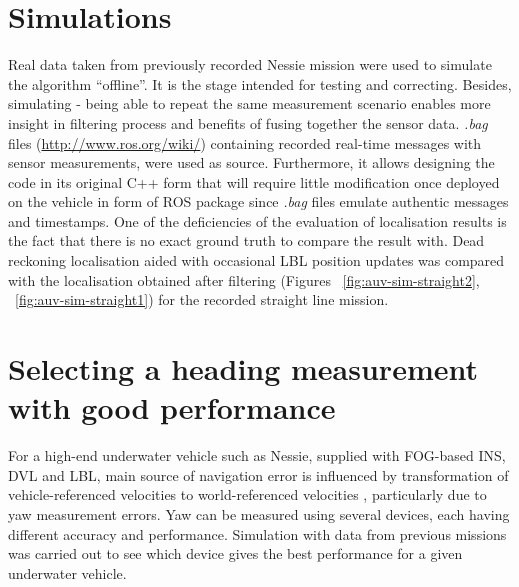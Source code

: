 \section{Simulations} \label{sec:sim}
Real data taken from previously recorded Nessie mission were used to simulate the algorithm ``offline''. It is the stage intended for testing and correcting. Besides, simulating - being able to repeat the same measurement scenario enables more insight in filtering process and benefits of fusing together the sensor data. \textit{.bag} files (\url{http://www.ros.org/wiki/}) containing recorded real-time messages with sensor measurements, were used as source. Furthermore, it allows designing the code in its original C++ form that will require little modification once deployed on the vehicle in form of ROS package since \textit{.bag} files emulate authentic messages and timestamps. One of the deficiencies of the evaluation of localisation results is the fact that there is no exact ground truth to compare the result with. Dead reckoning localisation aided with occasional LBL position updates was compared with the localisation obtained after filtering (Figures ~\ref{fig:auv-sim-straight2}, ~\ref{fig:auv-sim-straight1}) for the recorded straight line mission. 

\section{Selecting a heading measurement with good performance}
For a high-end underwater vehicle such as Nessie, supplied with FOG-based INS, DVL and LBL, main source of navigation error is influenced by transformation of vehicle-referenced velocities to world-referenced velocities \cite{bahr08}, particularly due to yaw measurement errors. Yaw can be measured using several devices, each having different accuracy and performance. Simulation with data from previous missions was carried out to see which device gives the best performance for a given underwater vehicle. 

